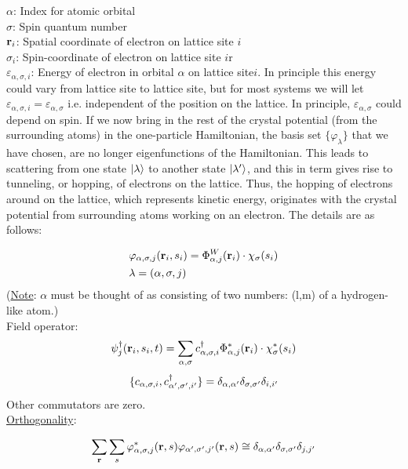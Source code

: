 \noindent $\alpha$: Index for atomic orbital \\
\noindent $\sigma$: Spin quantum number\\
\noindent $\vb{r}_i$: Spatial coordinate of electron on lattice site $i$\\
\noindent $\sigma_i$: Spin-coordinate of electron on lattice site $i$r\\
\noindent $\varepsilon_{\alpha,\sigma, i}$: Energy of electron in orbital $\alpha$ on lattice site$i$. In principle this energy could vary from lattice site to lattice site, but for most systems we will let $\varepsilon_{\alpha, \sigma, i} = \varepsilon_{\alpha, \sigma}$ i.e. independent of the position on the lattice. In principle, $\varepsilon_{\alpha, \sigma}$ could depend on spin. 
If we now bring in the rest of the crystal potential (from the surrounding atoms) in the one-particle Hamiltonian, the basis set $\{\varphi_\lambda \}$ that we have chosen, are no longer eigenfunctions of the Hamiltonian. This leads to scattering from one state $\ket{\lambda}$ to another state $\ket{\lambda'}$, and this in term gives rise to tunneling, or hopping, of electrons on the lattice. Thus, the hopping of electrons around on the lattice, which represents kinetic energy, originates with the crystal potential from surrounding atoms working on an electron. The details are as follows:

\begin{align*}
	&\varphi_{\alpha, \sigma,j}(\vb{r}_i,s_i) = \Phi_{\alpha, j}^W (\vb{r}_i) \cdot \chi_\sigma (s_i)\\
	&\lambda = (\alpha, \sigma, j)
\end{align*}
(\uline{Note}: $\alpha$ must be thought of as consisting of two numbers: (l,m) of a hydrogen-like atom.)\\

\noindent Field operator:
\begin{align*}
	\psi^\dagger_j(\vb{r}_i, s_i, t)= \sum_{\alpha, \sigma} c^{\dagger}_{\alpha, \sigma, i} \Phi_{\alpha, j}^* (\vb{r}_i) \cdot \chi^*_\sigma (s_i)
\end{align*}
\begin{align*}
	\{ c_{\alpha, \sigma, i},c^{\dagger}_{\alpha', \sigma', i'} \} = \delta_{\alpha, \alpha'} \delta_{\sigma,\sigma'} \delta_{i,i'}
\end{align*}
Other commutators are zero.\\

\noindent \uline{Orthogonality}:

\begin{align*}
	\sum_{\vb{r}} \sum_s  \varphi^*_{\alpha, \sigma,j}(\vb{r},s)\varphi_{\alpha', \sigma',j'}(\vb{r},s) \cong \delta_{\alpha, \alpha'} \delta_{\sigma,\sigma'} \delta_{j,j'}
\end{align*}

